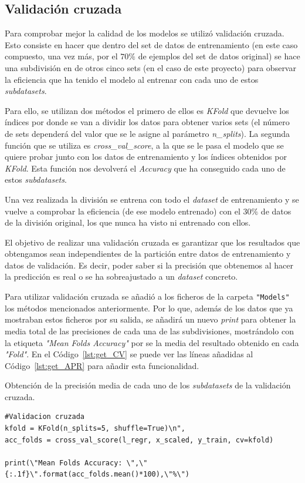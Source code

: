 \documentclass[a4paper, 12pt]{book}
\begin{document}
\subsection{Validación cruzada}

Para comprobar mejor la calidad de los modelos se utilizó validación cruzada. Esto consiste en hacer que dentro del set de datos de entrenamiento (en este caso compuesto, una vez más, por el $70\%$ de ejemplos del set de datos original) se hace una subdivisión en de otros cinco sets (en el caso de este proyecto) para observar la eficiencia que ha tenido el modelo al entrenar con cada uno de estos \textit{subdatasets}. 

Para ello, se utilizan dos métodos el primero de ellos es \textit{KFold} que devuelve los índices por donde se van a dividir los datos para obtener varios sets (el número de sets dependerá del valor que se le asigne al parámetro \textit{n\_splits}). La segunda función que se utiliza es \textit{cross\_val\_score}, a la que se le pasa el modelo que se quiere probar junto con los datos de entrenamiento y los índices obtenidos por \textit{KFold}. Esta función nos devolverá el \textit{Accuracy} que ha conseguido cada uno de estos \textit{subdatasets}.

Una vez realizada la división se entrena con todo el \textit{dataset} de entrenamiento y se vuelve a comprobar la eficiencia (de ese modelo entrenado) con el $30\%$ de datos de la división original, los que nunca ha visto ni entrenado con ellos.

El objetivo de realizar una validación cruzada es garantizar que los resultados que obtengamos sean independientes de la partición entre datos de entrenamiento y datos de validación. Es decir, poder saber si la precisión que obtenemos al hacer la predicción es real o se ha sobreajustado a un \textit{dataset} concreto.
 
 Para utilizar validación cruzada se añadió a los ficheros de la carpeta \texttt{"Models"} los métodos mencionados anteriormente. Por lo que, además de los datos que ya mostraban estos ficheros por su salida, se añadirá un nuevo \textit{print} para obtener la media total de las precisiones de cada una de las subdivisiones, mostrándolo con la etiqueta \textit{"Mean Folds Accuracy"} por se la media del resultado obtenido en cada \textit{"Fold"}. En el Código~\ref{lst:get_CV} se puede ver las líneas añadidas al Código~\ref{lst:get_APR} para añadir esta funcionalidad.
 
 \begin{listing}[]
    \caption{Obtención de la precisión media de cada uno de los \textit{subdatasets} de la validación cruzada.}{}
    \label{lst:get_CV}
    \begin{verbatim}
#Validacion cruzada
kfold = KFold(n_splits=5, shuffle=True)\n",
acc_folds = cross_val_score(l_regr, x_scaled, y_train, cv=kfold)

print(\"Mean Folds Accuracy: \",\"{:.1f}\".format(acc_folds.mean()*100),\"%\")
    \end{verbatim}
\end{listing}
 
\end{document}
